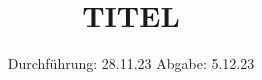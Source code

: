 

\subject{203}
\title{TITEL}
\date{%
  Durchführung: 28.11.23
  \hspace{3em}
  Abgabe: 5.12.23
}



\maketitle
\thispagestyle{empty}
\tableofcontents
\newpage






\printbibliography{}


